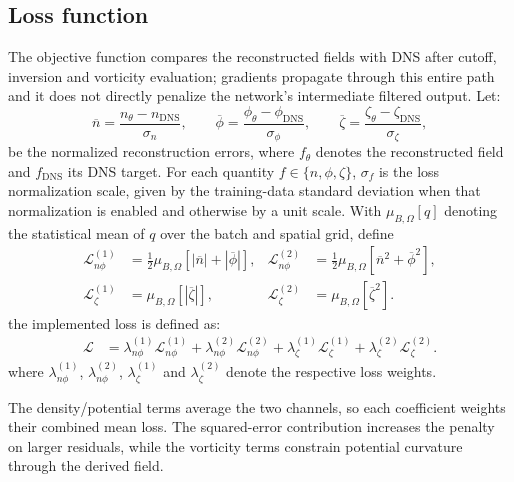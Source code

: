 \documentclass[authoryear,preprint,review,12pt]{elsarticle}
\begin{document}
\subsection{Loss function}
The objective function compares the reconstructed fields with DNS after cutoff, inversion and vorticity evaluation; gradients propagate through this entire path and it does not directly penalize the network's intermediate filtered output. Let:
\begin{equation}
    \overline{n}=\frac{n_\theta-n_{\mathrm{DNS}}}{\sigma_n},\qquad
    \overline{\phi}=\frac{\phi_\theta-\phi_{\mathrm{DNS}}}{\sigma_\phi},\qquad
    \overline{\zeta}=\frac{\zeta_\theta-\zeta_{\mathrm{DNS}}}{\sigma_\zeta},
\end{equation}
be the normalized reconstruction errors, where $f_\theta$ denotes the reconstructed field and $f_{\mathrm{DNS}}$ its DNS target. For each quantity $f\in\{n,\phi,\zeta\}$, $\sigma_f$ is the loss normalization scale, given by the training-data standard deviation when that normalization is enabled and otherwise by a unit scale. With $\mu_{B,\Omega}[q]$ denoting the statistical mean of $q$ over the batch and spatial grid, define
\begin{align}
    \mathcal{L}_{n\phi}^{(1)}
    &=\tfrac12\mu_{B,\Omega}\!\left[|\overline{n}|+|\overline{\phi}|\right],&
    \mathcal{L}_{n\phi}^{(2)}
    &=\tfrac12\mu_{B,\Omega}\!\left[\overline{n}^2+\overline{\phi}^2\right],\\
    \mathcal{L}_{\zeta}^{(1)}
    &=\mu_{B,\Omega}\!\left[|\overline{\zeta}|\right],&
    \mathcal{L}_{\zeta}^{(2)}
    &=\mu_{B,\Omega}\!\left[\overline{\zeta}^2\right].
\end{align}
the implemented loss is defined as:
\begin{align}
    \mathcal{L}
    &=\lambda_{n\phi}^{(1)}\mathcal{L}_{n\phi}^{(1)}
      +\lambda_{n\phi}^{(2)}\mathcal{L}_{n\phi}^{(2)}
      +\lambda_{\zeta}^{(1)}\mathcal{L}_{\zeta}^{(1)}
      +\lambda_{\zeta}^{(2)}\mathcal{L}_{\zeta}^{(2)}.
    \label{eq:training_loss}
\end{align}
where $\lambda_{n\phi}^{(1)}$, $\lambda_{n\phi}^{(2)}$, $\lambda_\zeta^{(1)}$ and $\lambda_\zeta^{(2)}$ denote the respective loss weights.

The density/potential terms average the two channels, so each coefficient weights their combined mean loss. The squared-error contribution increases the penalty on larger residuals, while the vorticity terms constrain potential curvature through the derived field.
\end{document}
